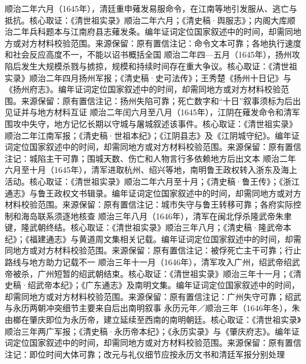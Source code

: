 顺治二年六月（1645年），清廷重申薙发易服命令，在江南等地引发服从、逃亡与抵抗。核心取证：《清世祖实录》顺治二年六月；《清史稿·舆服志》；内阁大库顺治二年兵科题本与江南府县志薙发条。编年证词定位国家叙述中的时间，却需同地方或对方材料校验范围。来源保留：原有置信注记：命令文本可靠；各地执行速度和社会反应高度不一，不能以诏书概括全国
顺治二年四—五月（1645年），扬州攻陷后发生大规模杀戮与掳掠，规模和持续时间存在重大争议。核心取证：《清世祖实录》顺治二年四月扬州军报；《清史稿·史可法传》；王秀楚《扬州十日记》与《扬州府志》。编年证词定位国家叙述中的时间，却需同地方或对方材料校验范围。来源保留：原有置信注记：扬州失陷可靠；死亡数字和“十日”叙事须标为后出见证并与地方材料互证
顺治二年闰六月至八月（1645年），江阴在薙发命令和清军围攻中失守，地方记忆长期以守城与屠城叙述该事件。核心取证：《清世祖实录》顺治二年江南军报；《清史稿·世祖本纪》；《江阴县志》及《江阴城守纪》。编年证词定位国家叙述中的时间，却需同地方或对方材料校验范围。来源保留：原有置信注记：城陷主干可靠；围城天数、伤亡和人物言行多依赖地方后出文本
顺治二年六月至十月（1645年），清军进取杭州、绍兴等地，南明鲁王政权转入浙东及海上活动。核心取证：《清世祖实录》顺治二年六月至十月；《清史稿·鲁王传》；《浙江通志》与鲁王政权文书辑录。编年证词定位国家叙述中的时间，却需同地方或对方材料校验范围。来源保留：原有置信注记：城市失守与鲁王转移可靠；各府实际控制和海岛联系须逐地核查
顺治三年八月（1646年），清军在闽北俘杀隆武帝朱聿键，隆武朝终结。核心取证：《清世祖实录》顺治三年八月；《清史稿·隆武帝本纪》；《福建通志》与黄道周文集相关记载。编年证词定位国家叙述中的时间，却需同地方或对方材料校验范围。来源保留：原有置信注记：被俘死亡主干可靠；行止路线与地方助力记载不一
顺治三年十一月（1646年），清军攻入广州，绍武帝绍武帝被杀，广州短暂的绍武朝结束。核心取证：《清世祖实录》顺治三年十一月；《清史稿·绍武帝本纪》；《广东通志》及南明文集。编年证词定位国家叙述中的时间，却需同地方或对方材料校验范围。来源保留：原有置信注记：广州失守可靠；绍武与永历两朝冲突细节主要来自后出南明叙事
永历元年／顺治三年（1646年冬），朱由榔在肇庆即位为永历帝，建立延续至西南的南明朝廷。核心取证：《清世祖实录》顺治三年两广军报；《清史稿·永历帝本纪》；《永历实录》与《肇庆府志》。编年证词定位国家叙述中的时间，却需同地方或对方材料校验范围。来源保留：原有置信注记：即位时间大体可靠；改元与礼仪细节应按永历文书和清廷军报分别处理
